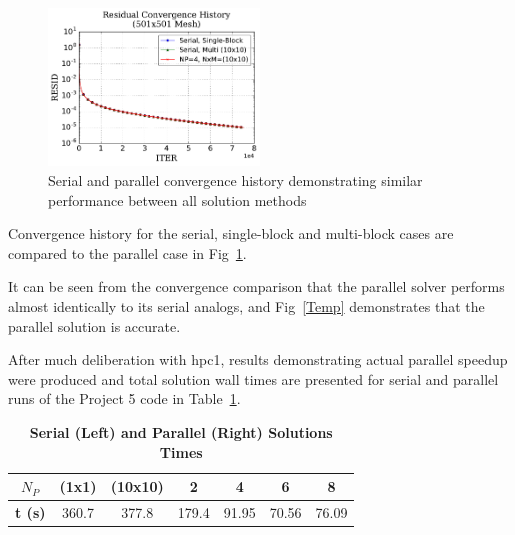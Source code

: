 \documentclass[twocolumn,10pt]{asme2ej}
\begin{document}
\begin{figure}[htb]
\begin{center}
\includegraphics[width=0.5\textwidth]{../Results/ResHist.pdf}
\caption{Serial and parallel convergence history demonstrating similar performance between all solution methods}
\label{ResHist}
\end{center}
\end{figure}







Convergence history for the serial, single-block and multi-block cases are compared to the parallel case in Fig~\ref{ResHist}.



It can be seen from the convergence comparison that the parallel solver performs almost identically to its serial analogs, and Fig~\ref{Temp} demonstrates that the parallel solution is accurate.



After much deliberation with hpc1, results demonstrating actual parallel speedup were produced and total solution wall times are presented for serial and parallel runs of the Project 5 code in Table~\ref{Times}.


\vspace{-1.8em}
\begin{table}[htb]
\begin{center}
\caption{\textbf{Serial (Left) and Parallel (Right) Solutions Times}}
\begin{tabular}{|c |c c | c c c c|}
\hline
\textbf{$N_P$} &(1x1) & (10x10) &  2 & 4 & 6  & 8     \\
\hline
 \textbf{t (s)} &360.7  & 377.8 & 179.4 & 91.95 & 70.56 & 76.09 \\
\hline
\end{tabular}
\label{Times}
\end{center}
\end{table}
\vspace{-2.3em}
\end{document}
